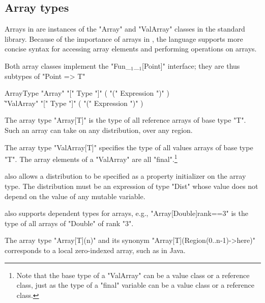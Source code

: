 \subsection{Array types}
\label{ArrayTypeConstructors}

Arrays in \Xten are instances of the 
\xcd"Array" and \xcd"ValArray"
classes in the standard library.
Because of the importance of arrays in \Xten{}, the language
supports more concise syntax for accessing array elements and
performing operations on arrays.

Both array classes implement the \xcdmath"Fun_$_1$_$_1$[Point]"
interface; they are thus subtypes of
\xcd"Point => T"


\begin{grammar}
  ArrayType \: \xcd"Array" \xcd"[" Type \xcd"]" ( \xcd"(" Expression \xcd")" )\opt \\
     \| \xcd"ValArray" \xcd"[" Type \xcd"]" ( \xcd"(" Expression \xcd")" )\opt
\end{grammar}

The array type \xcd"Array[T]" is the type of all
reference arrays of base type \xcd"T". Such an array can take on any
distribution, over any region. 

The array type \xcd"ValArray[T]" specifies the type of all
values arrays of base type \xcd"T".
The array elements of a \xcd"ValArray" are
all \xcd"final".\footnote{Note that the base type of a
\xcd"ValArray" can be a value class or a reference class, just as the 
type of a \xcd"final" variable can be a value class or a reference class.}

\XtenCurrVer{} also allows a distribution to be specified 
as a property initializer on the array type.
The distribution must be an expression of type
\xcd"Dist" whose
value does not depend on the value of any mutable variable.

\Xten{} also supports dependent types for arrays,
e.g.,
\xcd"Array[Double]{rank==3}" is the type of all arrays of 
\xcd"Double" of rank \xcd"3".

The array type
\xcd"Array[T](n)" and its synonym
\xcd"Array[T](Region(0..n-1)->here)" corresponds to a local
zero-indexed array, such as in Java.
